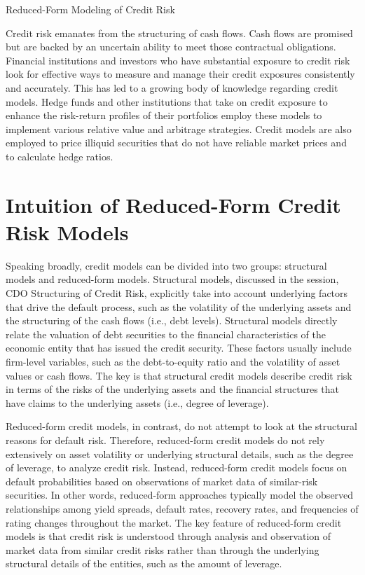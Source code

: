 \documentclass[11pt]{article}
\begin{document}
Reduced-Form Modeling of Credit Risk

Credit risk emanates from the structuring of cash flows. Cash flows are promised but are backed by an uncertain ability to meet those contractual obligations. Financial institutions and investors who have substantial exposure to credit risk look for effective ways to measure and manage their credit exposures consistently and accurately. This has led to a growing body of knowledge regarding credit models. Hedge funds and other institutions that take on credit exposure to enhance the risk-return profiles of their portfolios employ these models to implement various relative value and arbitrage strategies. Credit models are also employed to price illiquid securities that do not have reliable market prices and to calculate hedge ratios.

\section*{Intuition of Reduced-Form Credit Risk Models}
Speaking broadly, credit models can be divided into two groups: structural models and reduced-form models. Structural models, discussed in the session, CDO Structuring of Credit Risk, explicitly take into account underlying factors that drive the default process, such as the volatility of the underlying assets and the structuring of the cash flows (i.e., debt levels). Structural models directly relate the valuation of debt securities to the financial characteristics of the economic entity that has issued the credit security. These factors usually include firm-level variables, such as the debt-to-equity ratio and the volatility of asset values or cash flows. The key is that structural credit models describe credit risk in terms of the risks of the underlying assets and the financial structures that have claims to the underlying assets (i.e., degree of leverage).

Reduced-form credit models, in contrast, do not attempt to look at the structural reasons for default risk. Therefore, reduced-form credit models do not rely extensively on asset volatility or underlying structural details, such as the degree of leverage, to analyze credit risk. Instead, reduced-form credit models focus on default probabilities based on observations of market data of similar-risk securities. In other words, reduced-form approaches typically model the observed relationships among yield spreads, default rates, recovery rates, and frequencies of rating changes throughout the market. The key feature of reduced-form credit models is that credit risk is understood through analysis and observation of market data from similar credit risks rather than through the underlying structural details of the entities, such as the amount of leverage.
\end{document}
